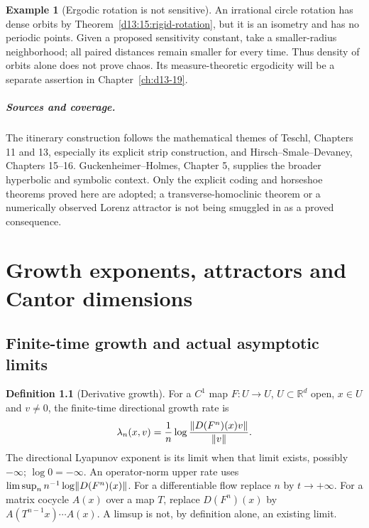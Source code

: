 \documentclass[11pt,oneside]{book}
\theoremstyle{definition}
\newtheorem{definition}[theorem]{Definition}
\newtheorem{example}[theorem]{Example}
\theoremstyle{remark}\newtheorem{remark}[theorem]{Remark}
\newcommand{\R}{\mathbb R}\newcommand{\C}{\mathbb C}
\begin{document}
\begin{example}[Ergodic rotation is not sensitive]
An irrational circle rotation has dense orbits by
Theorem~\ref{d13:15:rigid-rotation}, but it is an isometry and has no
periodic points. Given a proposed sensitivity constant, take a
smaller-radius neighborhood; all paired distances remain smaller
for every time. Thus density of orbits alone does not prove chaos.
Its measure-theoretic ergodicity will be a separate assertion in
Chapter~\ref{ch:d13-19}.
\end{example}

\paragraph{Sources and coverage.}
The itinerary construction follows the mathematical themes of
Teschl, Chapters 11 and 13, especially its explicit strip construction,
and Hirsch--Smale--Devaney, Chapters 15--16. Guckenheimer--Holmes,
Chapter 5, supplies the broader hyperbolic and symbolic context.
Only the explicit coding and horseshoe theorems proved here are
adopted; a transverse-homoclinic theorem or a numerically observed
Lorenz attractor is not being smuggled in as a proved consequence.



\chapter{Growth exponents, attractors and Cantor dimensions}\label{ch:d13-18}

\section{Finite-time growth and actual asymptotic limits}

\begin{definition}[Derivative growth]\label{d13:18:exponent-definition}
For a \(C^1\) map \(F:U\to U\), \(U\subset\R^d\) open, \(x\in U\)
and \(v\neq0\), the finite-time directional growth rate is
\[
 \lambda_n(x,v)=\frac1n\log\frac{\lVert D(F^n)(x)v\rVert}{\lVert v\rVert} .
\]
The directional Lyapunov exponent is its limit when that limit exists,
possibly \(-\infty\); \(\log0=-\infty\).
An operator-norm upper rate uses
\(\limsup_n n^{-1}\log\lVert D(F^n)(x)\rVert\).
For a differentiable flow replace \(n\) by \(t\to+\infty\).
For a matrix cocycle \(A(x)\) over a map \(T\), replace \(D(F^n)(x)\)
by \(A(T^{n-1}x)\cdots A(x)\).
A limsup is not, by definition alone, an existing limit.
\end{definition}
\end{document}
